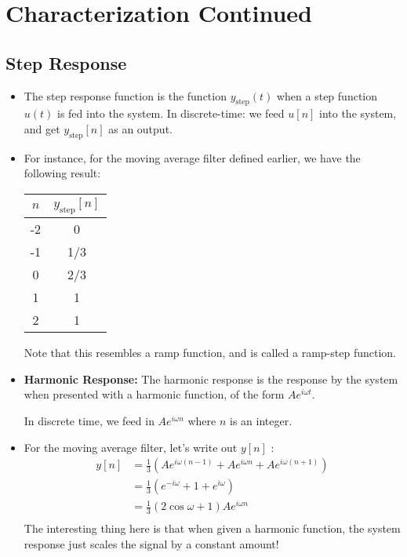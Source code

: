 \section{Characterization Continued}
\subsection{Step Response}
\begin{itemize}
	\item The step response function is the function \( y_{\text{step}}(t) \) when a step function 
		\( u(t) \) is fed into the system. In discrete-time: we feed \( u[n] \) into the system, and get 
		\( y_{\text{step}}[n] \) as an output.
	\item For instance, for the moving average filter defined earlier, we have the following result:
		\begin{center}
			\begin{tabular}{c|c}
				\( n \) &  \( y_{\text{step}}[n] \)\\
				\hline 
				-2 & 0\\
				-1 & 1/3\\
				0 & 2/3\\
				1 & 1\\
				2 & 1
			\end{tabular}
		\end{center}
		Note that this resembles a ramp function, and is called a ramp-step function.
	\item \textbf{Harmonic Response:} The harmonic response is the response by the system when presented with 
		a harmonic function, of the form \( Ae^{i \omega t}\). 

		In discrete time, we feed in \( Ae^{i \omega n} \) where \( n \) is an integer. 
	\item For the moving average filter, let's write out \( y[n] \) :
		\begin{align*}
			y[n] &= \frac{1}{3}\left(Ae^{i \omega (n - 1)} + Ae^{i \omega n} + Ae^{i \omega (n + 1)}\right)\\
			&= \frac{1}{3}\left( e^{-i \omega} + 1 + e^{i \omega} \right)  \\
			&= \frac{1}{3}(2 \cos \omega + 1) Ae^{i \omega n} \\
		\end{align*}
		The interesting thing here is that when given a harmonic function, the system response just scales the signal 
		by a constant amount!
\end{itemize}
